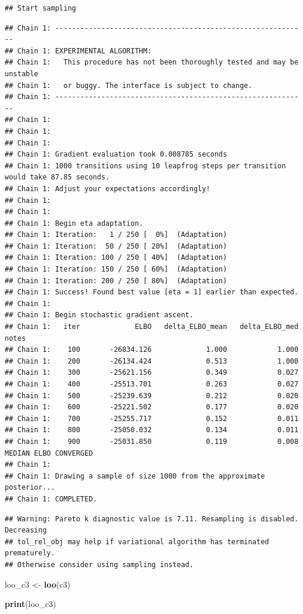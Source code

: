 \documentclass[
]{article}
\newenvironment{Shaded}{\begin{snugshade}}{\end{snugshade}}
\newcommand{\FunctionTok}[1]{\textcolor[rgb]{0.13,0.29,0.53}{\textbf{#1}}}
\newcommand{\NormalTok}[1]{#1}
\newcommand{\OtherTok}[1]{\textcolor[rgb]{0.56,0.35,0.01}{#1}}
\begin{document}
\begin{verbatim}
## Start sampling
\end{verbatim}

\begin{verbatim}
## Chain 1: ------------------------------------------------------------
## Chain 1: EXPERIMENTAL ALGORITHM:
## Chain 1:   This procedure has not been thoroughly tested and may be unstable
## Chain 1:   or buggy. The interface is subject to change.
## Chain 1: ------------------------------------------------------------
## Chain 1: 
## Chain 1: 
## Chain 1: 
## Chain 1: Gradient evaluation took 0.008785 seconds
## Chain 1: 1000 transitions using 10 leapfrog steps per transition would take 87.85 seconds.
## Chain 1: Adjust your expectations accordingly!
## Chain 1: 
## Chain 1: 
## Chain 1: Begin eta adaptation.
## Chain 1: Iteration:   1 / 250 [  0%]  (Adaptation)
## Chain 1: Iteration:  50 / 250 [ 20%]  (Adaptation)
## Chain 1: Iteration: 100 / 250 [ 40%]  (Adaptation)
## Chain 1: Iteration: 150 / 250 [ 60%]  (Adaptation)
## Chain 1: Iteration: 200 / 250 [ 80%]  (Adaptation)
## Chain 1: Success! Found best value [eta = 1] earlier than expected.
## Chain 1: 
## Chain 1: Begin stochastic gradient ascent.
## Chain 1:   iter             ELBO   delta_ELBO_mean   delta_ELBO_med   notes 
## Chain 1:    100       -26834.126             1.000            1.000
## Chain 1:    200       -26134.424             0.513            1.000
## Chain 1:    300       -25621.156             0.349            0.027
## Chain 1:    400       -25513.701             0.263            0.027
## Chain 1:    500       -25239.639             0.212            0.020
## Chain 1:    600       -25221.502             0.177            0.020
## Chain 1:    700       -25255.717             0.152            0.011
## Chain 1:    800       -25050.032             0.134            0.011
## Chain 1:    900       -25031.850             0.119            0.008   MEDIAN ELBO CONVERGED
## Chain 1: 
## Chain 1: Drawing a sample of size 1000 from the approximate posterior... 
## Chain 1: COMPLETED.
\end{verbatim}

\begin{verbatim}
## Warning: Pareto k diagnostic value is 7.11. Resampling is disabled. Decreasing
## tol_rel_obj may help if variational algorithm has terminated prematurely.
## Otherwise consider using sampling instead.
\end{verbatim}

\begin{Shaded}
\begin{Highlighting}[]
\NormalTok{loo\_c3 }\OtherTok{\textless{}{-}} \FunctionTok{loo}\NormalTok{(c3)}

\FunctionTok{print}\NormalTok{(loo\_c3)}
\end{Highlighting}
\end{Shaded}
\end{document}
